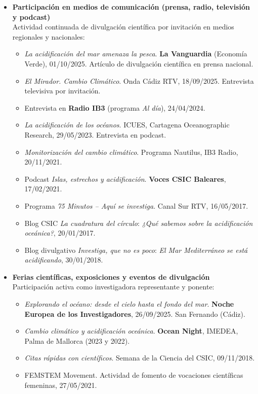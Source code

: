 \documentclass[11pt,a4paper]{article}
\begin{document}
\begin{itemize}[leftmargin=*]

    \item \textbf{Participación en medios de comunicación (prensa, radio, televisión y podcast)}\\
    Actividad continuada de divulgación científica por invitación en medios regionales y nacionales:
    \begin{itemize}
        \item \textit{La acidificación del mar amenaza la pesca}. \textbf{La Vanguardia} (Economía Verde), 01/10/2025. Artículo de divulgación científica en prensa nacional.
        \item \textit{El Mirador. Cambio Climático}. Onda Cádiz RTV, 18/09/2025. Entrevista televisiva por invitación.
        \item Entrevista en \textbf{Radio IB3} (programa \textit{Al día}), 24/04/2024.
        \item \textit{La acidificación de los océanos}. ICUES, Cartagena Oceanographic Research, 29/05/2023. Entrevista en podcast.
        \item \textit{Monitorización del cambio climático}. Programa Nautilus, IB3 Radio, 20/11/2021.
        \item Podcast \textit{Islas, estrechos y acidificación}. \textbf{Voces CSIC Baleares}, 17/02/2021.
        \item Programa \textit{75 Minutos – Aquí se investiga}. Canal Sur RTV, 16/05/2017.
        \item Blog CSIC \textit{La cuadratura del círculo}: \textit{¿Qué sabemos sobre la acidificación oceánica?}, 20/01/2017.
        \item Blog divulgativo \textit{Investiga, que no es poco}: \textit{El Mar Mediterráneo se está acidificando}, 30/01/2018.
    \end{itemize}

    \item \textbf{Ferias científicas, exposiciones y eventos de divulgación}\\
    Participación activa como investigadora representante y ponente:
    \begin{itemize}
        \item \textit{Explorando el océano: desde el cielo hasta el fondo del mar}. \textbf{Noche Europea de los Investigadores}, 26/09/2025. San Fernando (Cádiz).
        \item \textit{Cambio climático y acidificación oceánica}. \textbf{Ocean Night}, IMEDEA, Palma de Mallorca (2023 y 2022).
        \item \textit{Citas rápidas con científicos}. Semana de la Ciencia del CSIC, 09/11/2018.
        \item FEMSTEM Movement. Actividad de fomento de vocaciones científicas femeninas, 27/05/2021.
    \end{itemize}


\end{itemize}
\end{document}
